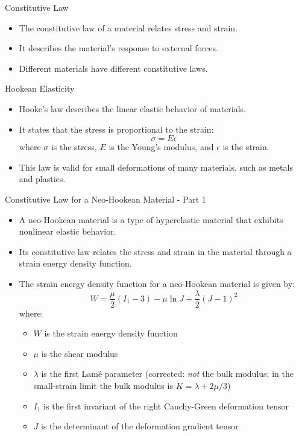 \documentclass{beamer}
\begin{document}
\begin{frame}{Constitutive Law}
    \begin{itemize}
        \item The constitutive law of a material relates stress and strain.
        \item It describes the material's response to external forces.
        \item Different materials have different constitutive laws.
    \end{itemize}
\end{frame}

\begin{frame}{Hookean Elasticity}
    \begin{itemize}
        \item Hooke's law describes the linear elastic behavior of materials.
        \item It states that the stress is proportional to the strain:
        \begin{equation*}
            \sigma = E \epsilon
        \end{equation*}
        where $\sigma$ is the stress, $E$ is the Young's modulus, and $\epsilon$ is the strain.
        \item This law is valid for small deformations of many materials, such as metals and plastics.
    \end{itemize}
\end{frame}



\begin{frame}{Constitutive Law for a Neo-Hookean Material - Part 1}
\begin{itemize}
\item A neo-Hookean material is a type of hyperelastic material that exhibits nonlinear elastic behavior.
\item Its constitutive law relates the stress and strain in the material through a strain energy density function.
\item The strain energy density function for a neo-Hookean material is given by:
\begin{equation*}
W = \frac{\mu}{2} (I_1 - 3) - \mu\ln J + \frac{\lambda}{2} (J - 1)^2
\end{equation*}
where:
\begin{itemize}
\item $W$ is the strain energy density function
\item $\mu$ is the shear modulus
\item $\lambda$ is the first Lam\'e parameter (corrected: \emph{not} the bulk modulus; in the small-strain limit the bulk modulus is $K = \lambda + 2\mu/3$)
\item $I_1$ is the first invariant of the right Cauchy-Green deformation tensor
\item $J$ is the determinant of the deformation gradient tensor
\end{itemize}
\end{itemize}
\end{frame}
\end{document}
